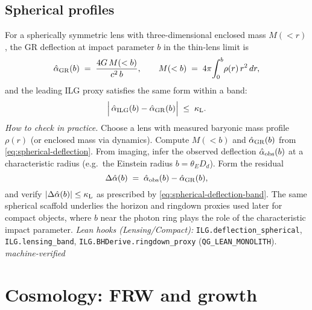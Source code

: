 \documentclass[12pt,a4paper]{article}
\begin{document}
\subsection{Spherical profiles}
For a spherically symmetric lens with three-dimensional enclosed mass \(M(<r)\), the GR deflection at impact parameter \(b\) in the thin-lens limit is
\begin{equation}
  \hat\alpha_{\rm GR}(b) \;=\; \frac{4G\,M(<b)}{c^2\,b},
  \qquad
  M(<b) \;=\; 4\pi\!\int_0^{b}\!\rho(r)\,r^2\,dr,
  \label{eq:spherical-deflection}
\end{equation}
and the leading ILG proxy satisfies the same form within a band:
\begin{equation}
  \Bigl|\,\hat\alpha_{\rm ILG}(b)-\hat\alpha_{\rm GR}(b)\Bigr|\;\le\;\kappa_{\rm L}.
  \label{eq:spherical-deflection-band}
\end{equation}
\emph{How to check in practice.} Choose a lens with measured baryonic mass profile \(\rho(r)\) (or enclosed mass via dynamics). Compute \(M(<b)\) and \(\hat\alpha_{\rm GR}(b)\) from \eqref{eq:spherical-deflection}. From imaging, infer the observed deflection \(\hat\alpha_{\rm obs}(b)\) at a characteristic radius (e.g.\ the Einstein radius \(b=\theta_E D_d\)). Form the residual
\[
\Delta\hat\alpha(b)\;=\;\hat\alpha_{\rm obs}(b)-\hat\alpha_{\rm GR}(b),
\]
and verify \(|\Delta\hat\alpha(b)|\le \kappa_{\rm L}\) as prescribed by \eqref{eq:spherical-deflection-band}. The same spherical scaffold underlies the horizon and ringdown proxies used later for compact objects, where \(b\) near the photon ring plays the role of the characteristic impact parameter. \emph{Lean hooks (Lensing/Compact):} \texttt{ILG.deflection\_spherical}, \texttt{ILG.lensing\_band}, \texttt{ILG.BHDerive.ringdown\_proxy} (\texttt{QG\_LEAN\_MONOLITH}). \emph{machine-verified}

\section{Cosmology: FRW and growth}
\end{document}
